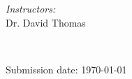 \begin{titlepage}
    \vspace*{\fill}

    \begin{minipage}{1\textwidth}
        \begin{flushright} \Large
            \emph{Instructors:}\\
            Dr. David Thomas\\
        \end{flushright}
    \end{minipage}\\[2em]
    \makeatother



    {\large Submission date: \today} %


\end{titlepage}
